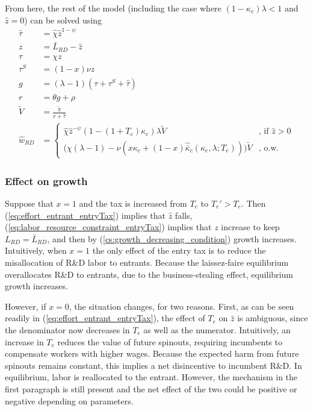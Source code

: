 \documentclass[11pt,english]{article}
\begin{document}
From here, the rest of the model (including the case where $(1-\kappa_e)\lambda < 1$ and $\hat{z} = 0$) can be solved using
\begin{align}
\hat{\tau} &= \hat{\chi} \hat{z}^{1-\psi} \\
z &= \bar{L}_{RD} - \hat{z} \label{eq:labor_resource_constraint_entryTax}\\ 
\tau &= \chi z \\
\tau^S &= (1-x) \nu z \\
g &= (\lambda - 1) (\tau + \tau^S + \hat{\tau}) \\
r &= \theta g + \rho \\
\tilde{V} &= \frac{\tilde{\pi}}{r + \hat{\tau}} \\ 
\hat{w}_{RD} &= \begin{cases}
				\hat{\chi} \hat{z}^{-\psi} (1-(1+T_e)\kappa_e) \lambda \tilde{V} &\textrm{, if } \hat{z} > 0\\
				\Big( \chi(\lambda -1) - \nu (x\kappa_c + (1-x)\hat{\bar{\kappa}}_c(\kappa_e,\lambda;T_e))\Big) \tilde{V} &\textrm{, o.w.}
			\end{cases} \label{eq:wage_rd_labor_entryTax}
\end{align}

\subsubsection{Effect on growth}

Suppose that $x = 1$ and the tax is increased from $T_e$ to $T_e' > T_e$. Then (\ref{eq:effort_entrant_entryTax}) implies that $\hat{z}$ falls, (\ref{eq:labor_resource_constraint_entryTax}) implies that $z$ increase to keep $L_{RD} = \bar{L}_{RD}$, and then by (\ref{cs:growth_decreasing_condition}) growth increases. Intuitively, when $x = 1$ the only effect of the entry tax is to reduce the misallocation of R\&D labor to entrants. Because the laissez-faire equilibrium overallocates R\&D to entrants, due to the business-stealing effect, equilibrium growth increases.

However, if $x = 0$, the situation changes, for two reasons. First, as can be seen readily in (\ref{eq:effort_entrant_entryTax}), the effect of $T_e$ on $\hat{z}$ is ambiguous, since the denominator now decreases in $T_e$ as well as the numerator. Intuitively, an increase in $T_e$ reduces the value of future spinouts, requiring incumbents to compensate workers with higher wages. Because the expected harm from future spinouts remains constant, this implies a net disincentive to incumbent R\&D. In equilibrium, labor is reallocated to the entrant. However, the mechanism in the first paragraph is still present and the net effect of the two could be positive or negative depending on parameters.
\end{document}
